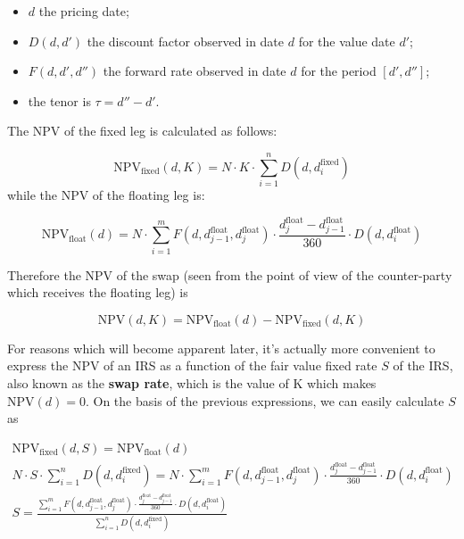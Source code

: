 \begin{itemize}
\tightlist
\item
  \(d\) the pricing date;
\item
  \(D(d, d')\) the discount factor observed in date \(d\) for the value
  date \(d'\);
\item
  \(F(d, d', d'')\) the forward rate observed in date \(d\) for the
  period \([d', d'']\); 
  \item the tenor is \(\tau = d'' - d'\).
\end{itemize}
The NPV of the fixed leg is calculated as follows:

\begin{equation}
\mathrm{NPV}_{\mathrm{fixed}}(d, K) = N\cdot K\cdot\sum_{i=1}^{n}D(d, d_{i}^{\mathrm{fixed}})\end{equation}
while the NPV of the floating leg is:

\begin{equation}\mathrm{NPV}_{\mathrm{float}}(d) = N\cdot\sum_{i=1}^{m}F(d, d_{j-1}^{\mathrm{float}}, d_{j}^{\mathrm{float}}) \cdot \frac{d_{j}^{\mathrm{float}}-d_{j-1}^{\mathrm{float}}}{360}
\cdot D(d, d_{i}^{\mathrm{float}})\end{equation}

Therefore the NPV of the swap (seen from the point of view of the
counter-party which receives the floating leg) is

\begin{equation}\mathrm{NPV}(d, K) = \mathrm{NPV}_{\mathrm{float}}(d) - \mathrm{NPV}_{\mathrm{fixed}}(d, K)\end{equation}

For reasons which will become apparent later, it's actually more
convenient to express the NPV of an IRS as a function of the fair value
fixed rate \(S\) of the IRS, also known as the \textbf{swap rate}, which
is the value of K which makes \(\mathrm{NPV}(d)=0\).
On the basis of the previous expressions, we can easily calculate \(S\)
as

\begin{equation}
\begin{gathered}
\mathrm{NPV}_{\mathrm{fixed}}(d, S) = \mathrm{NPV}_{\mathrm{float}}(d)\\
N\cdot S\cdot\sum_{i=1}^{n}D(d, d_{i}^{\mathrm{fixed}}) = N\cdot\sum_{i=1}^{m}F(d, d_{j-1}^{\mathrm{float}}, d_{j}^{\mathrm{float}}) \cdot \frac{d_{j}^{\mathrm{float}}-d_{j-1}^{\mathrm{float}}}{360} \cdot D(d, d_{i}^{\mathrm{float}})\\
S=\frac{\sum_{i=1}^{m}F(d, d_{j-1}^{\mathrm{float}}, d_{j}^{\mathrm{float}}) \cdot \frac{d_{j}^{\mathrm{float}}-d_{j-1}^{\mathrm{float}}}{360}
\cdot D(d, d_{i}^{\mathrm{float}})}{\sum_{i=1}^{n}D(d, d_i^{\mathrm{fixed}})}
\end{gathered}
\end{equation}


